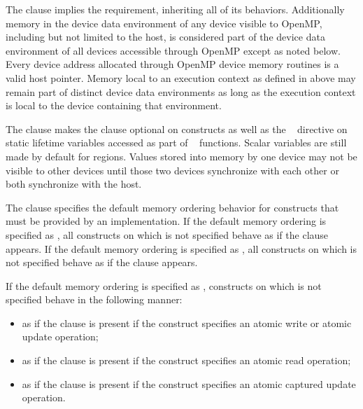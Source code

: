 The  clause implies the 
requirement, inheriting all of its behaviors.  Additionally memory in the
device data environment of any device visible to OpenMP, including but not
limited to the host, is considered part of the device data environment of all
devices accessible through OpenMP except as noted below.  Every device address
allocated through OpenMP device memory routines is a valid host pointer. Memory
local to an execution context as defined in  above may remain
part of distinct device data environments as long as the execution context is
local to the device containing that environment.

The  clause makes the  clause optional
on  constructs as well as the ~
directive on static lifetime variables accessed as part of
~ functions.  Scalar variables are still made
 by default for  regions.  Values stored into
memory by one device may not be visible to other devices until those two
devices synchronize with each other or both synchronize with the host.

The  clause specifies the default memory ordering
behavior for  constructs that must be provided by an
implementation. If the default memory ordering is specified as , all
 constructs on which  is not specified
behave as if the  clause appears. If the default memory
ordering is specified as , all  constructs on which
 is not specified behave as if the 
clause appears.

If the default memory ordering is specified as , 
constructs on which  is not specified behave in the
following manner:

\begin{itemize}
    \item as if the  clause is present if the construct
        specifies an atomic write or atomic update operation;
    \item as if the  clause is present if the construct
        specifies an atomic read operation;
    \item as if the  clause is present if the construct
        specifies an atomic captured update operation.
\end{itemize}

